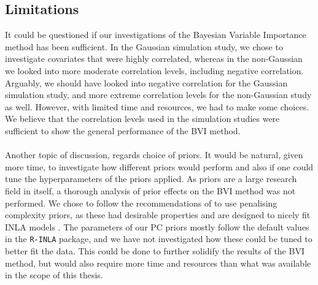 \subsection*{Limitations}
It could be questioned if our investigations of the Bayesian Variable Importance method has been sufficient. In the Gaussian simulation study, we chose to investigate covariates that were highly correlated, whereas in the non-Gaussian we looked into more moderate correlation levels, including negative correlation. Arguably, we should have looked into negative correlation for the Gaussian simulation study, and more extreme correlation levels for the non-Gaussian study as well. However, with limited time and resources, we had to make some choices. We believe that the correlation levels used in the simulation studies were sufficient to show the general performance of the BVI method.
\\
\\
Another topic of discussion, regards choice of priors. It would be natural, given more time, to investigate how different priors would perform and also if one could tune the hyperparameters of the priors applied. As priors are a large research field in itself, a thorough analysis of prior effects on the BVI method was not performed. We chose to follow the recommendations of \citet{simpson2017penalising} to use penalising complexity priors, as these had desirable properties and are designed to nicely fit INLA models \citep{simpson2017penalising}. The parameters of our PC priors mostly follow the default values in the \texttt{R-INLA} package, and we have not investigated how these could be tuned to better fit the data. This could be done to further solidify the results of the BVI method, but would also require more time and resources than what was available in the scope of this thesis. 
\\
\\
